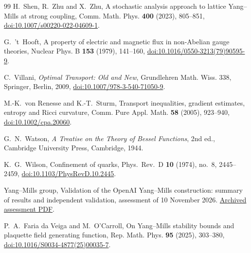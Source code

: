 \begin{thebibliography}{99}
H.~Shen, R.~Zhu and X.~Zhu, A stochastic analysis approach to lattice
Yang--Mills at strong coupling, Comm. Math. Phys. \textbf{400} (2023),
805--851, \href{https://doi.org/10.1007/s00220-022-04609-1}{doi:10.1007/s00220-022-04609-1}.

G.~'t~Hooft, A property of electric and magnetic flux in non-Abelian gauge theories, Nuclear Phys. B \textbf{153} (1979), 141--160, \href{https://doi.org/10.1016/0550-3213(79)90595-9}{doi:10.1016/0550-3213(79)90595-9}.

C.~Villani, \emph{Optimal Transport: Old and New}, Grundlehren Math. Wiss.
338, Springer, Berlin, 2009,
\href{https://doi.org/10.1007/978-3-540-71050-9}{doi:10.1007/978-3-540-71050-9}.

M.-K.~von Renesse and K.-T.~Sturm, Transport inequalities, gradient estimates, entropy and Ricci curvature, Comm. Pure Appl. Math. \textbf{58} (2005), 923--940, \href{https://doi.org/10.1002/cpa.20060}{doi:10.1002/cpa.20060}.

G.~N.~Watson, \emph{A Treatise on the Theory of Bessel Functions}, 2nd ed., Cambridge University Press, Cambridge, 1944.

K.~G.~Wilson, Confinement of quarks, Phys.\ Rev.\ D \textbf{10} (1974), no.~8, 2445--2459,
\href{https://doi.org/10.1103/PhysRevD.10.2445}{doi:10.1103/\allowbreak PhysRevD.10.2445}.

Yang--Mills group, Validation of the OpenAI Yang--Mills construction: summary
of results and independent validation, assessment of 10 November 2026.
\href{https://github.com/yang-mills-group/YM/blob/55ba9fc36293b3f4d52c6b1f813169a0be76ee98/docs/assessment-1.pdf}{Archived assessment PDF}.

P.~A.~Faria da Veiga and M.~O'Carroll, On Yang--Mills stability bounds
and plaquette field generating function, Rep. Math. Phys. \textbf{95}
(2025), 303--380,
\href{https://doi.org/10.1016/S0034-4877(25)00035-7}{doi:10.1016/S0034-4877(25)00035-7}.

\end{thebibliography}
